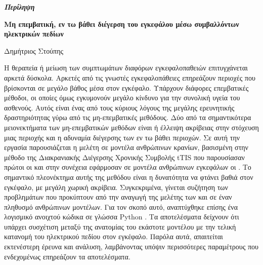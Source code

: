 \thispagestyle{plain}
\vspace*{\fill}
\begin{center}
    \LARGE
    \textit{\textbf{Περίληψη}}
        
    \vspace{0.4cm}
    \large
    \textbf{Μη επεμβατική, εν τω βάθει διέγερση του εγκεφάλου μέσω συμβαλλόντων ηλεκτρικών πεδίων}
        
    \vspace{0.4cm}
    Δημήτριος Στούπης
\end{center}
\normalsize

\vspace{0.9cm}
Η θεραπεία ή μείωση των συμπτωμάτων διαφόρων εγκεφαλοπαθειών επιτυγχάνεται αρκετά δύσκολα. Αρκετές από τις γνωστές εγκεφαλοπάθειες επηρεάζουν περιοχές που βρίσκονται σε μεγάλο βάθος μέσα στον εγκέφαλο. Υπάρχουν διάφορες επεμβατικές μέθοδοι, οι οποίες όμως εγκυμονούν μεγάλο κίνδυνο για την συνολική υγεία του ασθενούς. Αυτός είναι ένας από τους κύριους λόγους της μεγάλης ερευνητικής δραστηριότητας γύρω από τις μη-επεμβατικές μεθόδους. Δύο από τα σημαντικότερα μειονεκτήματα των μη-επεμβατικών μεθόδων είναι ή έλλειψη ακρίβειας στην στόχευση μιας περιοχής και η αδυναμία διέγερσης των εν τω βάθει περιοχών. Σε αυτή την εργασία παρουσιάζεται η μελέτη σε μοντέλα ανθρώπινων κρανίων, βασισμένη στην μέθοδο της Διακρανιακής Διέγερσης Χρονικής Συμβολής \gls{tTIS} που παρουσίασαν πρώτοι οι  και στην συνέχεια εφάρμοσαν σε μοντέλα ανθρώπινων εγκεφάλων οι . Το σημαντικό πλεονέκτημα αυτής της μεθόδου είναι η δυνατότητα να φτάνει βαθιά στον εγκέφαλο, με μεγάλη χωρική ακρίβεια. Συγκεκριμένα, γίνεται συζήτηση των προβλημάτων που προκύπτουν από την αναγωγή της μελέτης των  και  σε έναν πληθυσμό ανθρώπινων μοντέλων. Για τον σκοπό αυτό, αναπτύχθηκε επίσης ένα λογισμικό ανοιχτού κώδικα σε γλώσσα Python \cite{thesis_repo}. Τα αποτελέσματα δείχνουν ότι υπάρχει συσχέτιση μεταξύ της ανατομίας του εκάστοτε μοντέλου με την τελική κατανομή του ηλεκτρικού πεδίου στον εγκέφαλο. Παρόλα αυτά, απαιτείται εκτενέστερη έρευνα και ανάλυση, λαμβάνοντας υπόψιν περισσότερες παραμέτρους που ενδεχομένως επηρεάζουν τα αποτελέσματα.
\vspace*{\fill}

